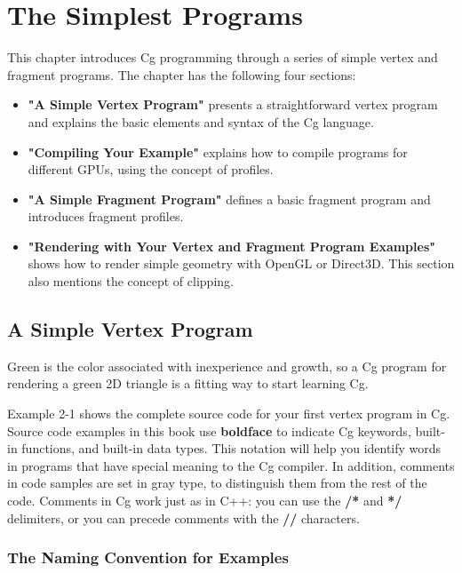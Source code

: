 \documentclass[../main.tex]{subfiles}
\begin{document}
\chapter{The Simplest Programs}

This chapter introduces Cg programming through a series of simple vertex and fragment programs. The chapter has the following four sections:

\FloatBarrier
\begin{itemize}
    \item \textbf{"A Simple Vertex Program"} presents a straightforward vertex program and explains the basic elements and syntax of the Cg language.
    \item \textbf{"Compiling Your Example"} explains how to compile programs for different GPUs, using the concept of profiles.
    \item \textbf{"A Simple Fragment Program"} defines a basic fragment program and introduces fragment profiles.
    \item \textbf{"Rendering with Your Vertex and Fragment Program Examples"} shows how to render simple geometry with OpenGL or Direct3D. This section also mentions the concept of clipping.
\end{itemize}
\FloatBarrier

\section{A Simple Vertex Program}

Green is the color associated with inexperience and growth, so a Cg program for rendering a green 2D triangle is a fitting way to start learning Cg.

Example 2-1 shows the complete source code for your first vertex program in Cg. Source code examples in this book use \textbf{boldface} to indicate Cg keywords, built-in functions, and built-in data types. This notation will help you identify words in programs that have special meaning to the Cg compiler. In addition, comments in code samples are set in gray type, to distinguish them from the rest of the code. Comments in Cg work just as in C++: you can use the \textbf{/*} and \textbf{*/} delimiters, or you can precede comments with the \textbf{//} characters.

\subsection*{The Naming Convention for Examples}
\end{document}
